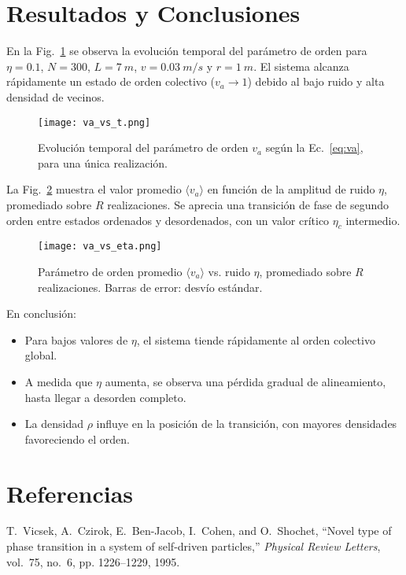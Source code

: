 \documentclass[12pt,a4paper]{article}
\begin{document}
\section{Resultados y Conclusiones}
En la Fig.~\ref{fig:va_vs_t} se observa la evolución temporal del parámetro de orden para $\eta = 0.1$, $N = 300$, $L = \SI{7}{m}$, $v = \SI{0.03}{m/s}$ y $r = \SI{1}{m}$.  
El sistema alcanza rápidamente un estado de orden colectivo ($v_a \to 1$) debido al bajo ruido y alta densidad de vecinos.

\begin{figure}[h]
    \centering
    \texttt{[image: va\_vs\_t.png]}
    \caption{Evolución temporal del parámetro de orden $v_a$ según la Ec.~\eqref{eq:va}, para una única realización.}
    \label{fig:va_vs_t}
\end{figure}

La Fig.~\ref{fig:va_vs_eta} muestra el valor promedio $\langle v_a \rangle$ en función de la amplitud de ruido $\eta$, promediado sobre $R$ realizaciones. Se aprecia una transición de fase de segundo orden entre estados ordenados y desordenados, con un valor crítico $\eta_c$ intermedio.

\begin{figure}[h]
    \centering
    \texttt{[image: va\_vs\_eta.png]}
    \caption{Parámetro de orden promedio $\langle v_a \rangle$ vs. ruido $\eta$, promediado sobre $R$ realizaciones. Barras de error: desvío estándar.}
    \label{fig:va_vs_eta}
\end{figure}

En conclusión:
\begin{itemize}
    \item Para bajos valores de $\eta$, el sistema tiende rápidamente al orden colectivo global.
    \item A medida que $\eta$ aumenta, se observa una pérdida gradual de alineamiento, hasta llegar a desorden completo.
    \item La densidad $\rho$ influye en la posición de la transición, con mayores densidades favoreciendo el orden.
\end{itemize}

\section*{Referencias}
\begin{thebibliography}{9}
T.~Vicsek, A.~Czirok, E.~Ben-Jacob, I.~Cohen, and O.~Shochet, ``Novel type of phase transition in a system of self-driven particles,'' \textit{Physical Review Letters}, vol.~75, no.~6, pp. 1226--1229, 1995.
\end{thebibliography}
\end{document}
